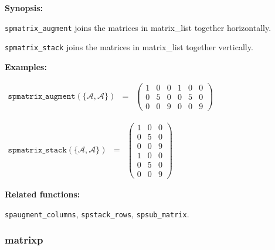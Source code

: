 \textbf{Synopsis:} 

\hspace*{0.175in} \texttt{spmatrix\_augment} joins the matrices in 
                  matrix\_list together horizontally. 

\hspace*{0.175in} 
\texttt{spmatrix\_stack} joins the matrices in matrix\_list 
                together vertically.

\textbf{Examples:}

\begin{flushleft}  
\hspace*{0.1in}
\begin{math}  
\begin{array}{ccc}
\texttt{spmatrix\_augment}(\{\mathcal{A,A}\}) & = & 
        \left( \begin{array}{cccccc} 1 & 0 & 0 & 1 & 0 & 0 \\ 0 & 5 & 0 
& 0 & 5 & 0 \\ 0 & 0 & 9 & 0 & 0 & 9
 \end{array} \right) 
\end{array}
\end{math}  
\end{flushleft}

\vspace*{0.1in}

\begin{flushleft}  
\hspace*{0.1in}
\begin{math}  
\begin{array}{ccc}
\texttt{spmatrix\_stack}(\{\mathcal{A,A}\}) & = & 
        \left( \begin{array}{ccc} 1 & 0 & 0 \\ 0 & 5 & 0 \\ 0 & 0 & 9 
\\ 1 & 0 & 0 \\ 0 & 5 & 0 \\ 0 & 0 & 9 
 \end{array} \right) 
\end{array}
\end{math}  
\end{flushleft}

\textbf{Related functions:}

\hspace*{0.175in} \texttt{spaugment\_columns}, \texttt{spstack\_rows}, 
\texttt{spsub\_matrix}.


\subsubsection{matrixp}

